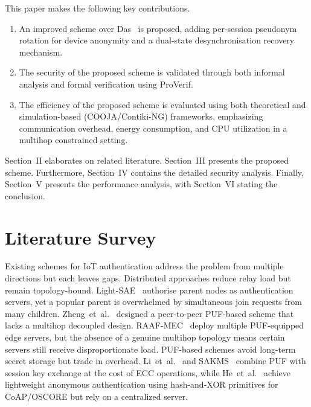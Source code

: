 \documentclass[conference]{IEEEtran}
\begin{document}
This paper makes the following key contributions.
\begin{enumerate}
  \item An improved scheme over Das~\cite{das2026comsnets} is proposed,
    adding per-session pseudonym rotation for device anonymity and a
    dual-state desynchronisation recovery mechanism.
  \item The security of the proposed scheme is validated through both
    informal analysis and formal verification using
    ProVerif.
  \item The efficiency of the proposed scheme is evaluated using both
    theoretical and simulation-based (COOJA/Contiki-NG) frameworks,
    emphasizing communication overhead, energy consumption, and CPU
    utilization in a multihop constrained setting.
\end{enumerate}

Section~II elaborates on related literature.  Section~III presents the
proposed scheme.  Furthermore, Section~IV contains the detailed security
analysis.  Finally, Section~V presents the performance analysis, with
Section~VI stating the conclusion.



\section{Literature Survey}

Existing schemes for IoT authentication address the problem from multiple
directions but each leaves gaps.  Distributed approaches reduce relay load but
remain topology-bound. Light-SAE~\cite{rosa2023lightsae}
authorise parent nodes as authentication servers, yet a popular parent is
overwhelmed by simultaneous join requests from many children.
Zheng~et~al.~\cite{zheng2022puf} designed a peer-to-peer PUF-based scheme
that lacks a multihop decoupled design. RAAF-MEC~\cite{alruwaili2025raaf}
deploy multiple PUF-equipped edge servers, but the absence of a genuine
multihop topology means certain servers still receive disproportionate load.
PUF-based schemes avoid long-term secret storage but trade in overhead.
Li~et~al.~\cite{li2020puf} and SAKMS~\cite{yang2024sakms} combine PUF
with session key exchange at the cost of ECC operations, while
He~et~al.~\cite{he2023lightweight} achieve lightweight anonymous authentication
using hash-and-XOR primitives for CoAP/OSCORE but rely on a centralized server.
\end{document}
